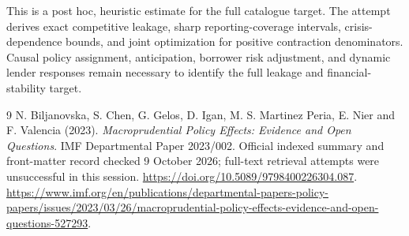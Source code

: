 \documentclass[11pt]{article}
\theoremstyle{remark}
\begin{document}
This is a post hoc, heuristic estimate for the full catalogue target.
The attempt derives exact competitive leakage, sharp reporting-coverage intervals, crisis-dependence bounds, and joint optimization for positive contraction denominators. Causal policy assignment, anticipation, borrower risk adjustment, and dynamic lender responses remain necessary to identify the full leakage and financial-stability target.

\begin{thebibliography}{9}
 N. Biljanovska, S. Chen, G. Gelos, D. Igan,
M. S. Martinez Peria, E. Nier and F. Valencia (2023).
\emph{Macroprudential Policy Effects: Evidence and Open Questions}.
IMF Departmental Paper 2023/002.
Official indexed summary and front-matter record checked 9 October 2026;
full-text retrieval attempts were unsuccessful in this session.
\url{https://doi.org/10.5089/9798400226304.087}.
\url{https://www.imf.org/en/publications/departmental-papers-policy-papers/issues/2023/03/26/macroprudential-policy-effects-evidence-and-open-questions-527293}.
\end{thebibliography}
\end{document}
